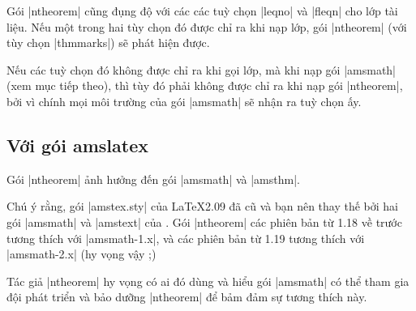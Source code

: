 Gói |ntheorem| cũng đụng độ với các các tuỳ chọn |leqno| và |fleqn| cho
lớp tài liệu. Nếu một trong hai tùy chọn đó được chỉ ra khi nạp lớp,
gói |ntheorem| (với tùy chọn |thmmarks|) sẽ phát hiện được.

\medskip
Nếu các tuỳ chọn đó không được chỉ ra khi gọi lớp, mà khi nạp gói |amsmath|
(xem mục tiếp theo), thì tùy đó phải không được chỉ ra khi nạp gói |ntheorem|,
bởi vì chính mọi môi trường của gói |amsmath| sẽ nhận ra tuỳ chọn ấy.

\subsection{\texorpdfstring{Với gói}{Voi goi} amslatex}
\label{sec:amslatex}

Gói |ntheorem| ảnh hưởng đến gói |amsmath| và |amsthm|.

\medskip
Chú ý rằng, gói |amstex.sty| của \LaTeX{}2.09 đã cũ và bạn nên thay thế
bởi hai gói |amsmath| và |amstext| của \LaTeXe{}. Gói |ntheorem| các phiên
bản từ 1.18 về trước tương thích với |amsmath-1.x|, và các phiên bản từ 1.19
tương thích với |amsmath-2.x| (hy vọng vậy ;)

\medskip
Tác giả |ntheorem| hy vọng có ai đó dùng và hiểu gói |amsmath| có thể
tham gia đội phát triển và bảo dưỡng |ntheorem| để bảm đảm sự tương thích này.

